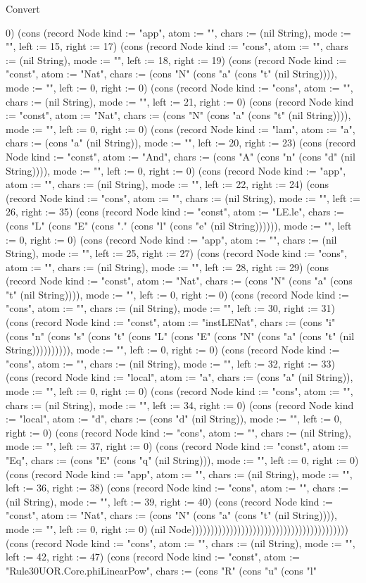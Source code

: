 \begin{lexlean}{Convert}
\begin{semanticmodule}
{0}) (cons (record Node {kind := "app", atom := "", chars := (nil String), mode := "", left := 15, right := 17}) (cons (record Node {kind := "cons", atom := "", chars := (nil String), mode := "", left := 18, right := 19}) (cons (record Node {kind := "const", atom := "Nat", chars := (cons "N" (cons "a" (cons "t" (nil String)))), mode := "", left := 0, right := 0}) (cons (record Node {kind := "cons", atom := "", chars := (nil String), mode := "", left := 21, right := 0}) (cons (record Node {kind := "const", atom := "Nat", chars := (cons "N" (cons "a" (cons "t" (nil String)))), mode := "", left := 0, right := 0}) (cons (record Node {kind := "lam", atom := "a", chars := (cons "a" (nil String)), mode := "", left := 20, right := 23}) (cons (record Node {kind := "const", atom := "And", chars := (cons "A" (cons "n" (cons "d" (nil String)))), mode := "", left := 0, right := 0}) (cons (record Node {kind := "app", atom := "", chars := (nil String), mode := "", left := 22, right := 24}) (cons (record Node {kind := "cons", atom := "", chars := (nil String), mode := "", left := 26, right := 35}) (cons (record Node {kind := "const", atom := "LE.le", chars := (cons "L" (cons "E" (cons "." (cons "l" (cons "e" (nil String)))))), mode := "", left := 0, right := 0}) (cons (record Node {kind := "app", atom := "", chars := (nil String), mode := "", left := 25, right := 27}) (cons (record Node {kind := "cons", atom := "", chars := (nil String), mode := "", left := 28, right := 29}) (cons (record Node {kind := "const", atom := "Nat", chars := (cons "N" (cons "a" (cons "t" (nil String)))), mode := "", left := 0, right := 0}) (cons (record Node {kind := "cons", atom := "", chars := (nil String), mode := "", left := 30, right := 31}) (cons (record Node {kind := "const", atom := "instLENat", chars := (cons "i" (cons "n" (cons "s" (cons "t" (cons "L" (cons "E" (cons "N" (cons "a" (cons "t" (nil String)))))))))), mode := "", left := 0, right := 0}) (cons (record Node {kind := "cons", atom := "", chars := (nil String), mode := "", left := 32, right := 33}) (cons (record Node {kind := "local", atom := "a", chars := (cons "a" (nil String)), mode := "", left := 0, right := 0}) (cons (record Node {kind := "cons", atom := "", chars := (nil String), mode := "", left := 34, right := 0}) (cons (record Node {kind := "local", atom := "d", chars := (cons "d" (nil String)), mode := "", left := 0, right := 0}) (cons (record Node {kind := "cons", atom := "", chars := (nil String), mode := "", left := 37, right := 0}) (cons (record Node {kind := "const", atom := "Eq", chars := (cons "E" (cons "q" (nil String))), mode := "", left := 0, right := 0}) (cons (record Node {kind := "app", atom := "", chars := (nil String), mode := "", left := 36, right := 38}) (cons (record Node {kind := "cons", atom := "", chars := (nil String), mode := "", left := 39, right := 40}) (cons (record Node {kind := "const", atom := "Nat", chars := (cons "N" (cons "a" (cons "t" (nil String)))), mode := "", left := 0, right := 0}) (nil Node))))))))))))))))))))))))))))))))))))))))) (cons (record Node {kind := "cons", atom := "", chars := (nil String), mode := "", left := 42, right := 47}) (cons (record Node {kind := "const", atom := "Rule30UOR.Core.phiLinearPow", chars := (cons "R" (cons "u" (cons "l" }
\end{semanticmodule}
\end{lexlean}
